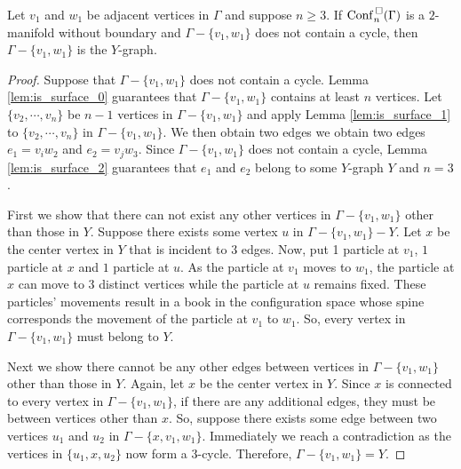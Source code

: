 \begin{lem}
\label{lem:is_surface_Y}
Let \(v_1\) and \(w_1\) be adjacent vertices in \(\Gamma\) and suppose \(n \ge 3\).
If \(\mathrm{Conf}^{\,\square}_n(\Gamma)\) is a \(2\)-manifold without boundary and \(\Gamma - \{v_1, w_1\}\) does not contain a cycle, then \(\Gamma - \{v_1, w_1\}\) is the \(Y\)-graph.
\end{lem}
\begin{proof}
Suppose that \(\Gamma - \{v_1, w_1\}\) does not contain a cycle.
Lemma \ref{lem:is_surface_0} guarantees that \(\Gamma - \{v_1, w_1\}\) contains
at least \(n\) vertices.
Let \(\{v_2, \cdots, v_n\}\) be \(n-1\) vertices in \(\Gamma - \{v_1, w_1\}\)
and apply Lemma \ref{lem:is_surface_1} to \(\{v_2, \cdots, v_n\}\) in \(\Gamma - \{v_1, w_1\}\).
We then obtain two edges we obtain two edges \(e_1 = v_i w_2\) and \(e_2 = v_j w_3\).
Since \(\Gamma - \{v_1, w_1\}\) does not contain a cycle, Lemma \ref{lem:is_surface_2} guarantees that
\(e_1\) and \(e_2\) belong to some \(Y\)-graph \(Y\) and \(n = 3\).

First we show that there can not exist any other vertices in \(\Gamma - \{v_1, w_1\}\) other than those in \(Y\).
Suppose there exists some vertex \(u\) in \(\Gamma - \{v_1, w_1\} - Y\). 
Let \(x\) be the center vertex in \(Y\) that is incident to \(3\) edges.
Now, put 1 particle at \(v_1\), \(1\) particle at \(x\) and \(1\) particle at \(u\).
As the particle at \(v_1\) moves to \(w_1\), the particle at \(x\) can move
to 3 distinct vertices while the particle at \(u\) remains fixed.
These particles' movements result in a book in the configuration space
whose spine corresponds the movement of the particle at \(v_1\) to \(w_1\).
So, every vertex in \(\Gamma - \{v_1, w_1\}\) must belong to \(Y\).

Next we show there cannot be any other edges between vertices in \(\Gamma - \{v_1, w_1\}\)
other than those in \(Y\). Again, let \(x\) be the center vertex in \(Y\).
Since \(x\) is connected to every vertex in \(\Gamma - \{v_1, w_1\}\), if 
there are any additional edges, they must be between vertices other than \(x\).
So, suppose there exists some edge between two vertices \(u_1\) and \(u_2\) in \(\Gamma - \{x, v_1, w_1\}\).
Immediately we reach a contradiction as the vertices in \(\{u_1, x, u_2\}\) now form a \(3\)-cycle.
Therefore, \(\Gamma - \{v_1, w_1\} = Y\).
\end{proof}
